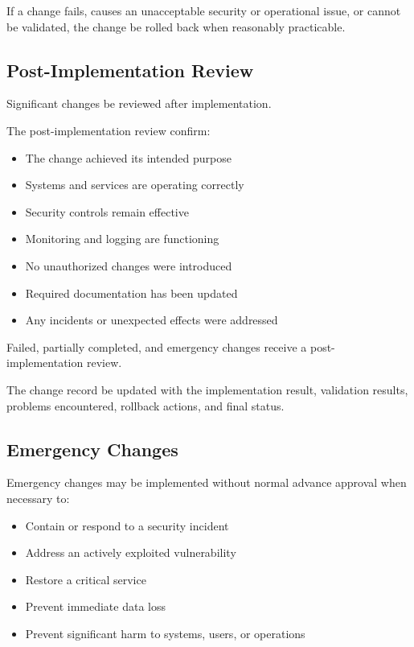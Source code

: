 If a change fails, causes an unacceptable security or operational issue, or cannot be validated, the change \should{} be rolled back when reasonably practicable.

\subsection{Post-Implementation Review}

Significant changes \must{} be reviewed after implementation.

The post-implementation review \should{} confirm:
\begin{itemize}
    \item The change achieved its intended purpose
    \item Systems and services are operating correctly
    \item Security controls remain effective
    \item Monitoring and logging are functioning
    \item No unauthorized changes were introduced
    \item Required documentation has been updated
    \item Any incidents or unexpected effects were addressed
\end{itemize}

Failed, partially completed, and emergency changes \must{} receive a post-implementation review.

The change record \must{} be updated with the implementation result, validation results, problems encountered, rollback actions, and final status.

\subsection{Emergency Changes}

Emergency changes may be implemented without normal advance approval when necessary to:
\begin{itemize}
    \item Contain or respond to a security incident
    \item Address an actively exploited vulnerability
    \item Restore a critical service
    \item Prevent immediate data loss
    \item Prevent significant harm to systems, users, or operations
\end{itemize}

